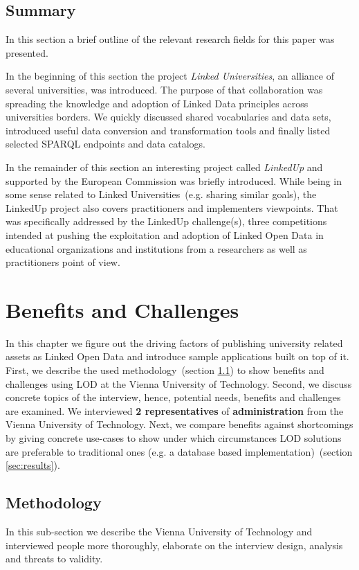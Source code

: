\documentclass{article}
\begin{document}
\subsection{Summary}
In this section a brief outline of the relevant research fields for this paper was presented.

In the beginning of this section the project \textit{Linked Universities}, an alliance of several universities, was introduced. The purpose of that collaboration was spreading the knowledge and adoption of Linked Data principles across universities borders. We quickly discussed shared vocabularies and data sets, introduced useful data conversion and transformation tools and finally listed selected SPARQL endpoints and data catalogs.

In the remainder of this section an interesting project called \textit{LinkedUp} and supported by the European Commission was briefly introduced. While being in some sense related to Linked Universities~(e.g. sharing similar goals), the LinkedUp project also covers practitioners and implementers viewpoints. That was specifically addressed by the LinkedUp challenge(s), three competitions intended at pushing the exploitation and adoption of Linked Open Data in educational organizations and institutions from a researchers as well as practitioners point of view. 
 
\section{Benefits and Challenges}
\label{sec:benefits_and_challenges}
In this chapter we figure out the driving factors of publishing university related assets as Linked Open Data and introduce sample applications built on top of it. First, we describe the used methodology~(section \ref{sec:methodology}) to show benefits and challenges using LOD at the Vienna University of Technology. Second, we discuss concrete topics of the interview, hence, potential needs, benefits and challenges are examined. We interviewed \textbf{2 representatives} of \textbf{administration} from the Vienna University of Technology. Next, we compare benefits against shortcomings by giving concrete use-cases to show under which circumstances LOD solutions are preferable to traditional ones (e.g. a database based implementation)~(section \ref{sec:results}). 

\subsection{Methodology}
\label{sec:methodology}
In this sub-section we describe the Vienna University of Technology and interviewed people more thoroughly, elaborate on the interview design, analysis and threats to validity.
\end{document}
